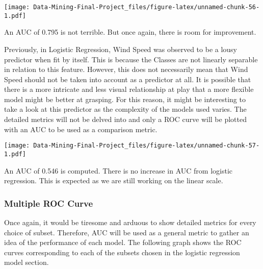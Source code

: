 \documentclass[
]{article}
\newenvironment{Shaded}{\begin{snugshade}}{\end{snugshade}}
\newcommand{\AttributeTok}[1]{\textcolor[rgb]{0.13,0.29,0.53}{#1}}
\newcommand{\ConstantTok}[1]{\textcolor[rgb]{0.56,0.35,0.01}{#1}}
\newcommand{\DecValTok}[1]{\textcolor[rgb]{0.00,0.00,0.81}{#1}}
\newcommand{\FunctionTok}[1]{\textcolor[rgb]{0.13,0.29,0.53}{\textbf{#1}}}
\newcommand{\NormalTok}[1]{#1}
\newcommand{\OtherTok}[1]{\textcolor[rgb]{0.56,0.35,0.01}{#1}}
\newcommand{\SpecialCharTok}[1]{\textcolor[rgb]{0.81,0.36,0.00}{\textbf{#1}}}
\newcommand{\StringTok}[1]{\textcolor[rgb]{0.31,0.60,0.02}{#1}}
\begin{document}
\texttt{[image: Data-Mining-Final-Project\_files/figure-latex/unnamed-chunk-56-1.pdf]}

An AUC of 0.795 is not terrible. But once again, there is room for
improvement.

Previously, in Logistic Regression, Wind Speed was observed to be a
lousy predictor when fit by itself. This is because the Classes are not
linearly separable in relation to this feature. However, this does not
necessarily mean that Wind Speed should not be taken into account as a
predictor at all. It is possible that there is a more intricate and less
visual relationship at play that a more flexible model might be better
at grasping. For this reason, it might be interesting to take a look at
this predictor as the complexity of the models used varies. The detailed
metrics will not be delved into and only a ROC curve will be plotted
with an AUC to be used as a comparison metric.

\begin{Shaded}
\end{Shaded}

\texttt{[image: Data-Mining-Final-Project\_files/figure-latex/unnamed-chunk-57-1.pdf]}

An AUC of 0.546 is computed. There is no increase in AUC from logistic
regression. This is expected as we are still working on the linear
scale.

\subsubsection{Multiple ROC Curve}\label{multiple-roc-curve-1}

Once again, it would be tiresome and arduous to show detailed metrics
for every choice of subset. Therefore, AUC will be used as a general
metric to gather an idea of the performance of each model. The following
graph shows the ROC curves corresponding to each of the subsets chosen
in the logistic regression model section.
\end{document}
